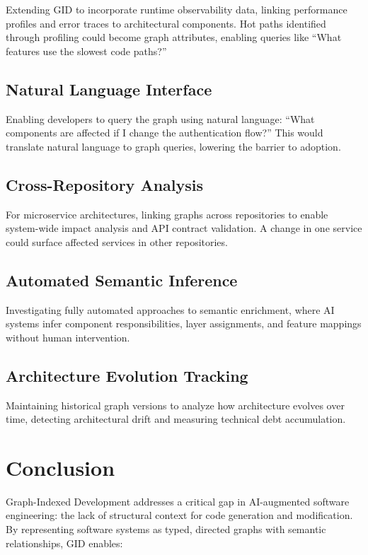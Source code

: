 \documentclass[11pt,a4paper]{article}
\begin{document}
Extending GID to incorporate runtime observability data, linking performance profiles and error traces to architectural components. Hot paths identified through profiling could become graph attributes, enabling queries like ``What features use the slowest code paths?''

\subsection{Natural Language Interface}

Enabling developers to query the graph using natural language: ``What components are affected if I change the authentication flow?'' This would translate natural language to graph queries, lowering the barrier to adoption.

\subsection{Cross-Repository Analysis}

For microservice architectures, linking graphs across repositories to enable system-wide impact analysis and API contract validation. A change in one service could surface affected services in other repositories.

\subsection{Automated Semantic Inference}

Investigating fully automated approaches to semantic enrichment, where AI systems infer component responsibilities, layer assignments, and feature mappings without human intervention.

\subsection{Architecture Evolution Tracking}

Maintaining historical graph versions to analyze how architecture evolves over time, detecting architectural drift and measuring technical debt accumulation.

\section{Conclusion}

Graph-Indexed Development addresses a critical gap in AI-augmented software engineering: the lack of structural context for code generation and modification. By representing software systems as typed, directed graphs with semantic relationships, GID enables:
\end{document}
